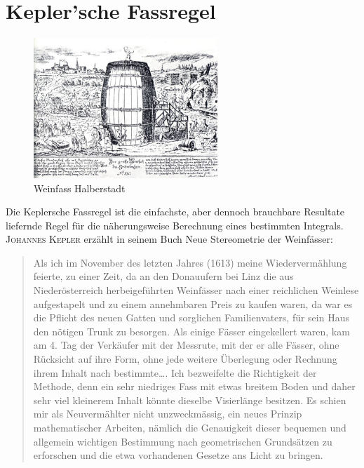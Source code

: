 \documentclass[%
11pt,%
twoside,%
titlepage,%
german,%
headsepline%
]{scrartcl}
\begin{document}
\clearpage

\section{Kepler'sche Fassregel}

\begin{figure}
  \begin{center}
    \includegraphics[width=0.618\textwidth]{pictures/weinfass}
  \end{center}
\caption{Weinfass Halberstadt}
\end{figure}

Die Keplersche Fassregel ist die einfachste, aber dennoch brauchbare Resultate liefernde Regel für die näherungsweise Berechnung eines bestimmten Integrals.
\textsc{Johannes Kepler} erzählt in seinem Buch \glqq Neue Stereometrie der Weinfässer\grqq:
\begin{quote}
Als ich im November des letzten Jahres (1613) meine Wiedervermählung feierte, zu einer Zeit, da an den Donauufern bei Linz die aus Niederösterreich herbeigeführten Weinfässer nach einer reichlichen Weinlese aufgestapelt und zu einem annehmbaren Preis zu kaufen waren, da war es die Pflicht des neuen Gatten und sorglichen Familienvaters, für sein Haus den nötigen Trunk zu besorgen. Als einige Fässer eingekellert waren, kam am 4. Tag der Verkäufer mit der Messrute, mit der er alle Fässer, ohne Rücksicht auf ihre Form, ohne jede weitere Überlegung oder Rechnung ihrem Inhalt nach bestimmte\dots. Ich bezweifelte die Richtigkeit der Methode, denn ein sehr niedriges Fass mit etwas breitem Boden und daher sehr viel kleinerem Inhalt könnte dieselbe Visierlänge besitzen. Es schien mir als Neuvermählter nicht unzweckmässig, ein neues Prinzip mathematischer Arbeiten, nämlich die Genauigkeit dieser bequemen und allgemein wichtigen Bestimmung nach geometrischen Grundsätzen zu erforschen und die etwa vorhandenen Gesetze ans Licht zu bringen.\grqq
\end{quote}
\end{document}
